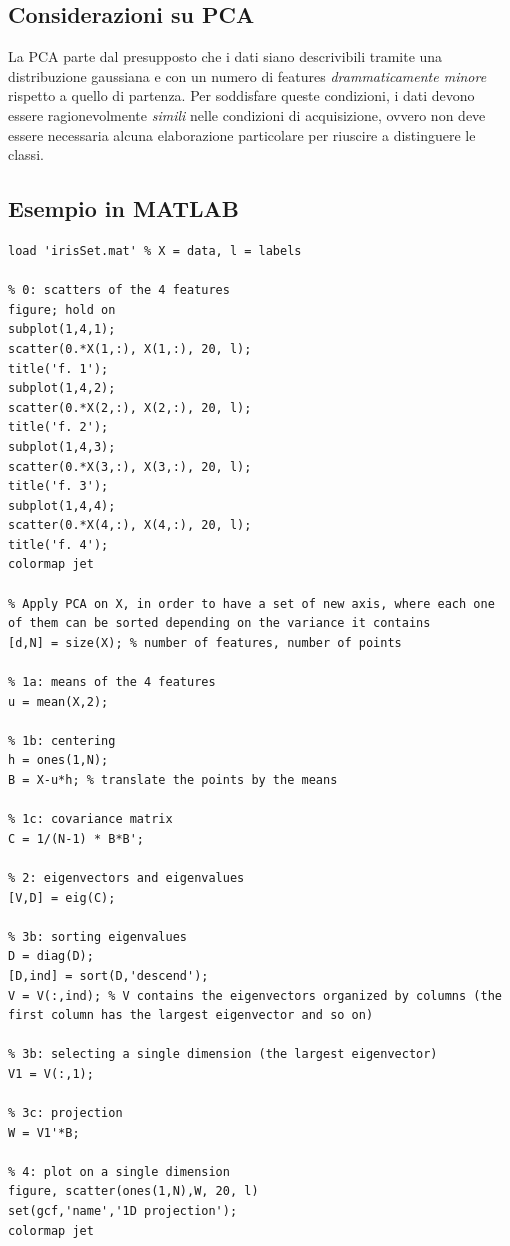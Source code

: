 \documentclass[a4paper,oneside,titlepage]{book}
\begin{document}
\subsection{Considerazioni su PCA}
La PCA parte dal presupposto che i dati siano descrivibili tramite una distribuzione gaussiana e con un numero di features \textit{drammaticamente minore} rispetto a quello di partenza. Per soddisfare queste condizioni, i dati devono essere ragionevolmente \textit{simili} nelle condizioni di acquisizione, ovvero non deve essere necessaria alcuna elaborazione particolare per riuscire a distinguere le classi.

\subsection{Esempio in MATLAB}
\begin{verbatim}
load 'irisSet.mat' % X = data, l = labels

% 0: scatters of the 4 features
figure; hold on
subplot(1,4,1);
scatter(0.*X(1,:), X(1,:), 20, l);
title('f. 1');
subplot(1,4,2);
scatter(0.*X(2,:), X(2,:), 20, l);
title('f. 2');
subplot(1,4,3);
scatter(0.*X(3,:), X(3,:), 20, l);
title('f. 3');
subplot(1,4,4);
scatter(0.*X(4,:), X(4,:), 20, l);
title('f. 4');
colormap jet

% Apply PCA on X, in order to have a set of new axis, where each one of them can be sorted depending on the variance it contains
[d,N] = size(X); % number of features, number of points

% 1a: means of the 4 features
u = mean(X,2);

% 1b: centering
h = ones(1,N);
B = X-u*h; % translate the points by the means

% 1c: covariance matrix
C = 1/(N-1) * B*B';

% 2: eigenvectors and eigenvalues
[V,D] = eig(C);

% 3b: sorting eigenvalues
D = diag(D);
[D,ind] = sort(D,'descend');
V = V(:,ind); % V contains the eigenvectors organized by columns (the first column has the largest eigenvector and so on)

% 3b: selecting a single dimension (the largest eigenvector)
V1 = V(:,1);

% 3c: projection
W = V1'*B;

% 4: plot on a single dimension
figure, scatter(ones(1,N),W, 20, l)
set(gcf,'name','1D projection');
colormap jet
\end{verbatim}
\end{document}
